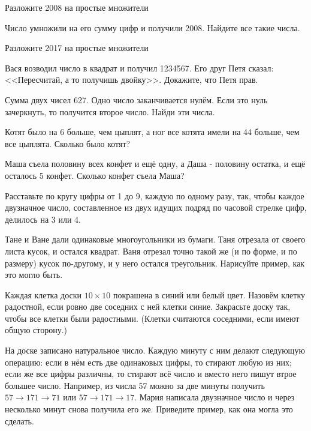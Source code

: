 \documentclass{article}
\begin{document}
\begin{enumerate_boxed}
        \item Разложите 2008 на простые множители

        \item Число умножили на его сумму цифр и получили 2008.
        Найдите все такие числа.

        \item Разложите 2017 на простые множители

        \item Вася возводил число в квадрат и получил 1234567.
        Его друг Петя сказал: <<Пересчитай, а то получишь двойку>>.
        Докажите, что Петя прав.

        \item Сумма двух чисел 627.
        Одно число заканчивается нулём.
        Если это нуль зачеркнуть, то получится второе число.
        Найди эти числа.

        \item Котят было на 6 больше, чем цыплят, а ног все котята имели на 44 больше, чем все цыплята.
        Сколько было котят?

        \item Маша съела половину всех конфет и ещё одну, а Даша - половину остатка, и ещё осталось 5 конфет.
        Сколько конфет съела Маша?

        \item Расставьте по кругу цифры от 1 до 9, каждую по одному разу, так, чтобы каждое двузначное число, составленное из двух идущих подряд по часовой стрелке цифр, делилось на 3 или 4.

        \item Тане и Ване дали одинаковые многоугольники из бумаги.
        Таня отрезала от своего листа кусок, и остался квадрат.
        Ваня отрезал точно такой же (и по форме, и по размеру) кусок по-другому, и у него остался треугольник.
        Нарисуйте пример, как это могло быть.

        \item  Каждая клетка доски $10 \times 10$ покрашена в синий или белый цвет.
        Назовём клетку радостной, если ровно две соседних с ней клетки синие.
        Закрасьте доску так, чтобы все клетки были радостными.
        (Клетки считаются соседними, если имеют общую сторону.)

        \item На доске записано натуральное число.
        Каждую минуту с ним делают следующую операцию: если в нём есть две одинаковых цифры, то стирают любую из них; если же все цифры различны, то стирают всё число и вместо него пишут втрое большее число.
        Например, из числа 57 можно за две минуты получить $57 \rightarrow 171 \rightarrow 71$ или $57 \rightarrow 171 \rightarrow 17$.
        Мария написала двузначное число и через несколько минут снова получила его же.
        Приведите пример, как она могла это сделать.


\end{enumerate_boxed}
\end{document}
